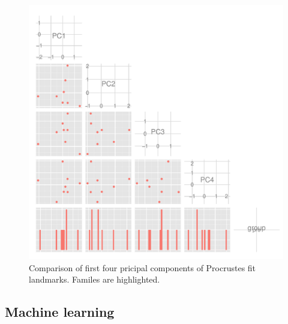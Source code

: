 \documentclass{article}\usepackage{graphicx, color}
\begin{document}
\begin{figure}[p]
  \centering
  \includegraphics[height = 0.4\textheight, keepaspectratio = true]{figure/pca-plots3}
  \caption{Comparison of first four pricipal components of Procrustes fit landmarks. Familes are highlighted.}
  \label{fig:fish-pca}
\end{figure}

\subsection{Machine learning}
\end{document}
